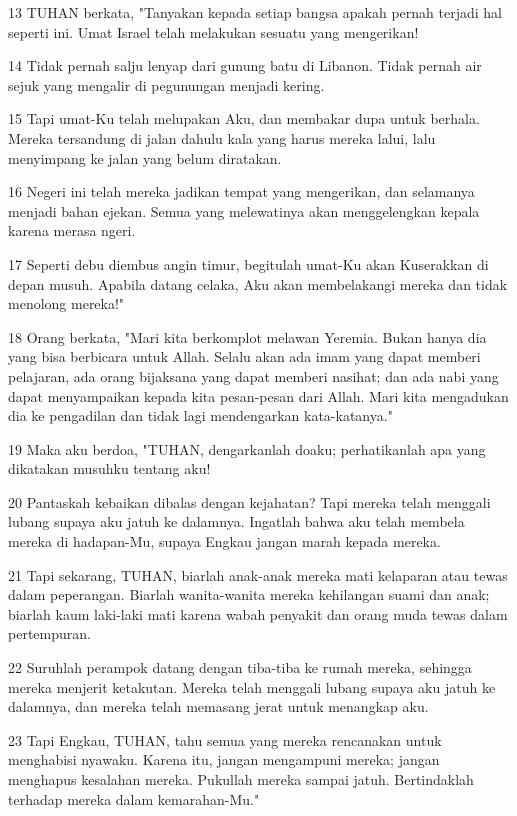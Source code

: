\par 13 TUHAN berkata, "Tanyakan kepada setiap bangsa apakah pernah terjadi hal seperti ini. Umat Israel telah melakukan sesuatu yang mengerikan!
\par 14 Tidak pernah salju lenyap dari gunung batu di Libanon. Tidak pernah air sejuk yang mengalir di pegunungan menjadi kering.
\par 15 Tapi umat-Ku telah melupakan Aku, dan membakar dupa untuk berhala. Mereka tersandung di jalan dahulu kala yang harus mereka lalui, lalu menyimpang ke jalan yang belum diratakan.
\par 16 Negeri ini telah mereka jadikan tempat yang mengerikan, dan selamanya menjadi bahan ejekan. Semua yang melewatinya akan menggelengkan kepala karena merasa ngeri.
\par 17 Seperti debu diembus angin timur, begitulah umat-Ku akan Kuserakkan di depan musuh. Apabila datang celaka, Aku akan membelakangi mereka dan tidak menolong mereka!"
\par 18 Orang berkata, "Mari kita berkomplot melawan Yeremia. Bukan hanya dia yang bisa berbicara untuk Allah. Selalu akan ada imam yang dapat memberi pelajaran, ada orang bijaksana yang dapat memberi nasihat; dan ada nabi yang dapat menyampaikan kepada kita pesan-pesan dari Allah. Mari kita mengadukan dia ke pengadilan dan tidak lagi mendengarkan kata-katanya."
\par 19 Maka aku berdoa, "TUHAN, dengarkanlah doaku; perhatikanlah apa yang dikatakan musuhku tentang aku!
\par 20 Pantaskah kebaikan dibalas dengan kejahatan? Tapi mereka telah menggali lubang supaya aku jatuh ke dalamnya. Ingatlah bahwa aku telah membela mereka di hadapan-Mu, supaya Engkau jangan marah kepada mereka.
\par 21 Tapi sekarang, TUHAN, biarlah anak-anak mereka mati kelaparan atau tewas dalam peperangan. Biarlah wanita-wanita mereka kehilangan suami dan anak; biarlah kaum laki-laki mati karena wabah penyakit dan orang muda tewas dalam pertempuran.
\par 22 Suruhlah perampok datang dengan tiba-tiba ke rumah mereka, sehingga mereka menjerit ketakutan. Mereka telah menggali lubang supaya aku jatuh ke dalamnya, dan mereka telah memasang jerat untuk menangkap aku.
\par 23 Tapi Engkau, TUHAN, tahu semua yang mereka rencanakan untuk menghabisi nyawaku. Karena itu, jangan mengampuni mereka; jangan menghapus kesalahan mereka. Pukullah mereka sampai jatuh. Bertindaklah terhadap mereka dalam kemarahan-Mu."

